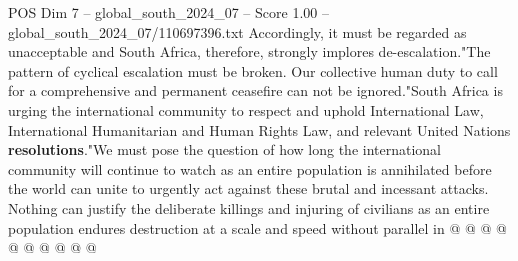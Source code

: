 \begin{textsample}{POS Dim 7 – global\_south\_2024\_07 – Score 1.00 – global\_south\_2024\_07/110697396.txt}
Accordingly, it must be regarded as unacceptable and South Africa, therefore, strongly implores de-escalation."The pattern of cyclical escalation must be broken.
Our collective human duty to call for a comprehensive and permanent ceasefire can not be ignored."South Africa is urging the international community to respect and uphold International Law, International Humanitarian and Human Rights Law, and relevant United Nations \textbf{resolutions}."We must pose the question of how long the international community will continue to watch as an entire population is annihilated before the world can unite to urgently act against these brutal and incessant attacks.
Nothing can justify the deliberate killings and injuring of civilians as an entire population endures destruction at a scale and speed without parallel in @ @ @ @ @ @ @ @ @ @

\end{textsample}
